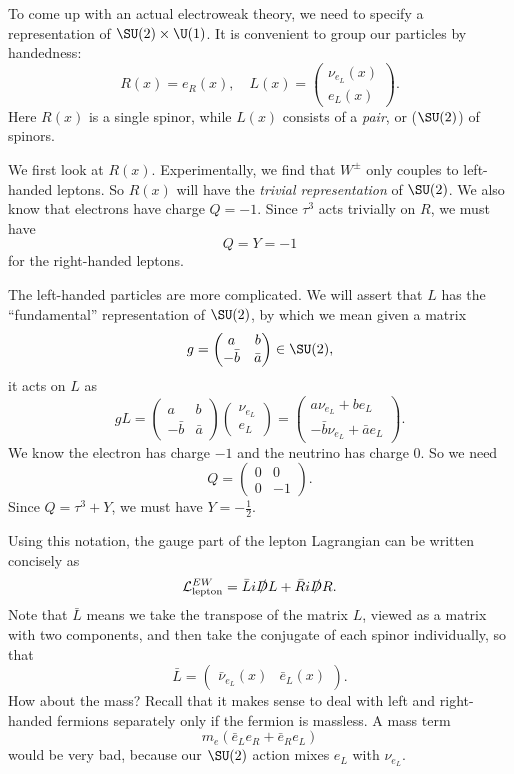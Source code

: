 \documentclass[a4paper]{article}
\begin{document}
To come up with an actual electroweak theory, we need to specify a representation of $\SU(2) \times \U(1)$. It is convenient to group our particles by handedness:
\[
  R(x) = e_R(x),\quad L(x) =
  \begin{pmatrix}
    \nu_{e_L}(x)\\
    e_L(x)
  \end{pmatrix}.
\]
Here $R(x)$ is a single spinor, while $L(x)$ consists of a \emph{pair}, or ($\SU(2)$)  of spinors.

We first look at $R(x)$. Experimentally, we find that $W^{\pm}$ only couples to left-handed leptons. So $R(x)$ will have the \emph{trivial representation} of $\SU(2)$. We also know that electrons have charge $Q = -1$. Since $\tau^3$ acts trivially on $R$, we must have
\[
  Q = Y = -1
\]
for the right-handed leptons.

The left-handed particles are more complicated. We will assert that $L$ has the ``fundamental'' representation of $\SU(2)$, by which we mean given a matrix
\[
  g = \begin{pmatrix}
    a & b\\
    -\bar{b} & \bar{a}
  \end{pmatrix}\in \SU(2),
\]
it acts on $L$ as
\[
  g L =
  \begin{pmatrix}
    a & b\\
    - \bar{b} & \bar{a}
  \end{pmatrix}
  \begin{pmatrix}
    \nu_{e_L}\\
    e_L
  \end{pmatrix} =
  \begin{pmatrix}
    a \nu_{e_L} + b e_L\\
    -\bar{b} \nu_{e_L} + \bar{a} e_L
  \end{pmatrix}.
\]
We know the electron has charge $-1$ and the neutrino has charge $0$. So we need
\[
  Q =
  \begin{pmatrix}
    0 & 0 \\
    0 & -1
  \end{pmatrix}.
\]
Since $Q = \tau^3 + Y$, we must have $Y = -\frac{1}{2}$.

Using this notation, the gauge part of the lepton Lagrangian can be written concisely as
\[
  \mathcal{L}_{\mathrm{lepton}}^{EW} = \bar L i \slashed D L + \bar R i \slashed D R.
\]
Note that $\bar{L}$ means we take the transpose of the matrix $L$, viewed as a matrix with two components, and then take the conjugate of each spinor individually, so that
\[
  \bar{L} =
  \begin{pmatrix}
    \bar{\nu}_{e_L}(x) & \bar{e}_L(x)
  \end{pmatrix}.
\]
How about the mass? Recall that it makes sense to deal with left and right-handed fermions separately only if the fermion is massless. A mass term
\[
  m_e (\bar{e}_Le_R + \bar{e}_R e_L)
\]
would be very bad, because our $\SU(2)$ action mixes $e_L$ with $\nu_{e_L}$.
\end{document}
